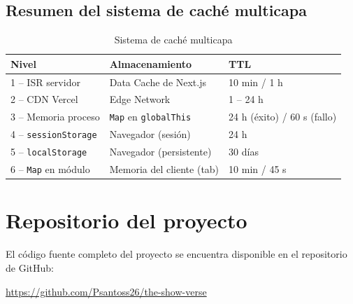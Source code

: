\begin{samepage}
\section*{Resumen del sistema de caché multicapa}

\begin{table}[H]
\begin{center}
\begin{tabular}{| l | l | l |}
\hline
\textbf{Nivel} & \textbf{Almacenamiento} & \textbf{TTL} \\
\hline
\hline
1 -- ISR servidor & Data Cache de Next.js & 10 min / 1 h \\
\hline
2 -- CDN Vercel & Edge Network & 1 -- 24 h \\
\hline
3 -- Memoria proceso & \texttt{Map} en \texttt{globalThis} & 24 h (éxito) / 60 s (fallo) \\
\hline
4 -- \texttt{sessionStorage} & Navegador (sesión) & 24 h \\
\hline
5 -- \texttt{localStorage} & Navegador (persistente) & 30 días \\
\hline
6 -- \texttt{Map} en módulo & Memoria del cliente (tab) & 10 min / 45 s \\
\hline
\end{tabular}
\caption{Sistema de caché multicapa}
\label{tab:cache-multicapa}
\end{center}
\end{table}
\end{samepage}

\section*{Repositorio del proyecto}

El código fuente completo del proyecto se encuentra disponible en el repositorio de GitHub:

\begin{center}
\url{https://github.com/Psantoss26/the-show-verse}
\end{center}

